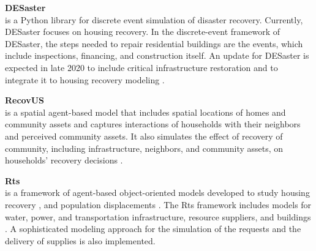 \noindent\textbf{DESaster} \\is a Python library for discrete event simulation of disaster recovery. Currently, DESaster focuses on housing recovery. In the discrete-event framework of DESaster, the steps needed to repair residential buildings are the events, which include inspections, financing, and construction itself. An update for DESaster is expected in late 2020 to include critical infrastructure restoration and to integrate it to housing recovery modeling \citep{DESaster}.\ 

\noindent\textbf{RecovUS} \\ is a spatial agent-based model that includes spatial locations of homes and community assets and captures interactions of households with their neighbors and perceived community assets. It also simulates the effect of recovery of community, including infrastructure, neighbors, and community assets, on households’ recovery decisions \citep{moradi2020recovus}. 

\noindent\textbf{Rts} \\ is a framework of agent-based object-oriented models developed to study housing recovery \citep{costa2020housing}, and population displacements \citep{costa2020predicting}. The Rts framework includes models for water, power, and transportation infrastructure, resource suppliers, and buildings \citep{Costa2019thesis}. A sophisticated modeling approach for the simulation of the requests and the delivery of supplies is also implemented. \ 
